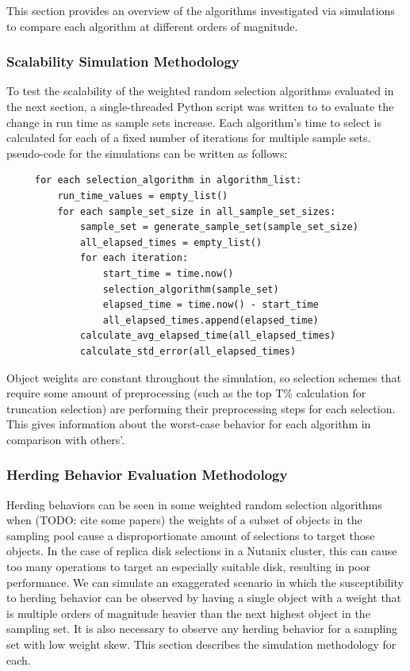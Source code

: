 \documentclass[12pt]{article}
\begin{document}
  This section provides an overview of the algorithms investigated via
  simulations to compare each algorithm at different orders of magnitude.

    \subsubsection{Scalability Simulation Methodology}
     To test the scalability of the weighted random selection algorithms
     evaluated in the next section, a single-threaded Python script was written
     to to evaluate the change in run time as sample sets increase. Each
     algorithm's time to select is calculated for each of a fixed number of
     iterations for multiple sample sets. pseudo-code for the simulations
     can be written as follows:

     \begin{verbatim}
     for each selection_algorithm in algorithm_list:
         run_time_values = empty_list()
         for each sample_set_size in all_sample_set_sizes:
             sample_set = generate_sample_set(sample_set_size)
             all_elapsed_times = empty_list()
             for each iteration:
                 start_time = time.now()
                 selection_algorithm(sample_set)
                 elapsed_time = time.now() - start_time
                 all_elapsed_times.append(elapsed_time)
             calculate_avg_elapsed_time(all_elapsed_times)
             calculate_std_error(all_elapsed_times)
     \end{verbatim}
        
    Object weights are constant throughout the simulation, so selection schemes
    that require some amount of preprocessing (such as the top T\% calculation
    for truncation selection) are performing their preprocessing steps for each
    selection. This gives information about the worst-case behavior for each
    algorithm in comparison with others'.

    \subsubsection{Herding Behavior Evaluation Methodology}
    Herding behaviors can be seen in some weighted random selection
    algorithms when (TODO: cite some papers) the weights of a subset of objects
    in the sampling pool cause a disproportionate amount of selections to
    target those objects. In the case of replica disk selections in a Nutanix
    cluster, this can cause too many operations to target an especially
    suitable disk, resulting in poor performance. We can simulate an
    exaggerated scenario in which the susceptibility to herding behavior can be
    observed by having a single object with a weight that is multiple orders of
    magnitude heavier than the next highest object in the sampling set. It is
    also necessary to observe any herding behavior for a sampling set with low
    weight skew. This section describes the simulation methodology for each.
\end{document}
